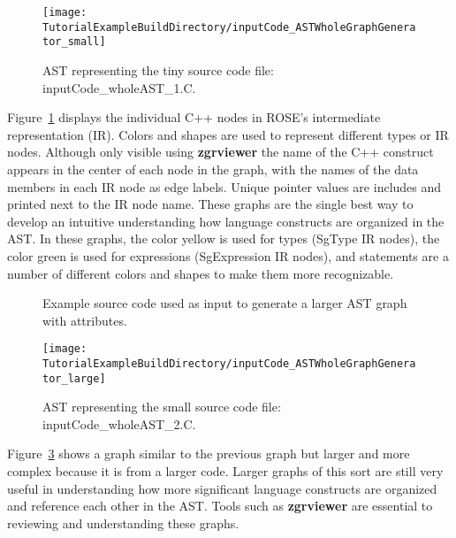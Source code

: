 \begin{figure}
\texttt{[image: \\TutorialExampleBuildDirectory/inputCode\_ASTWholeGraphGenerator\_small]}
\caption{AST representing the tiny source code file: inputCode\_wholeAST\_1.C.}
\label{tutorial:exampleOutputCodeWholeGraph_small}
\end{figure}

   Figure~\ref{tutorial:exampleOutputCodeWholeGraph_small} displays the individual
C++ nodes in ROSE's intermediate representation (IR).  Colors and shapes are used to 
represent different types or IR nodes. Although only visible using {\bf zgrviewer} 
the name of the C++ construct appears in the center of each node in the graph, with 
the names of the data members in each IR node as edge labels. Unique pointer values
are includes and printed next to the IR node name.  These graphs are the single best
way to develop an intuitive understanding how language constructs are organized
in the AST.  In these graphs, the color yellow is used for types (SgType IR nodes),
the color green is used for expressions (SgExpression IR nodes), and statements
are a number of different colors and shapes to make them more recognizable.


\begin{figure}[!h]
{\indent
{\mySmallFontSize

\begin{latexonly}
   
\end{latexonly}

\begin{htmlonly}
   
\end{htmlonly}

}
}
\caption{Example source code used as input to generate a larger AST graph with attributes.}
\label{Tutorial:exampleInputCode_ASTGraphGenerator_large}
\end{figure}

\begin{figure}
\texttt{[image: \\TutorialExampleBuildDirectory/inputCode\_ASTWholeGraphGenerator\_large]}
\caption{AST representing the small source code file: inputCode\_wholeAST\_2.C.}
\label{tutorial:exampleOutputCodeWholeGraph_large}
\end{figure}

   Figure~\ref{tutorial:exampleOutputCodeWholeGraph_large} shows a graph similar to the
previous graph but larger and more complex because it is from a larger code. Larger
graphs of this sort are still very useful in understanding how more significant
language constructs are organized and reference each other in the AST.  Tools
such as {\bf zgrviewer} are essential to reviewing and understanding these
graphs.

